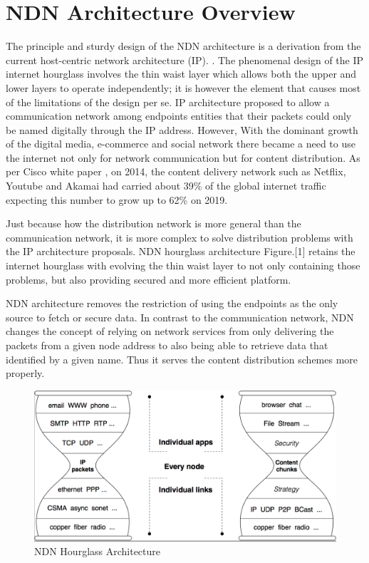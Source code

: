 \documentclass[twocolumn]{article}
\begin{document}
\section{NDN Architecture Overview}
The principle and sturdy design of the NDN architecture is a derivation from the current host-centric network architecture (IP). \cite{Pan2011}. The phenomenal design of the IP internet hourglass involves the thin waist layer which allows both the upper and lower layers to operate independently; it is however the element that causes most of the limitations of the design per se. IP architecture proposed to allow a communication network among endpoints entities that their packets could only be named digitally through the IP address. However, With the dominant growth of the digital media, e-commerce and social network there became a need to use the internet not only for network communication but for content distribution. As per Cisco white paper \cite{Cisco2015}, on 2014, the content delivery network such as Netflix, Youtube and Akamai had carried about 39\% of the global internet traffic expecting this number to grow up to 62\% on 2019.

Just because how the distribution network is more general than the communication network, it is more complex to solve distribution problems with the IP architecture proposals. NDN hourglass architecture Figure.[1] retains the internet hourglass with evolving the thin waist layer to not only containing those problems, but also providing secured and more efficient platform.

NDN architecture removes the restriction of using the endpoints as the only source to fetch or secure data. In contrast to the communication network, NDN changes the concept of relying on network services from only delivering the packets from a given node address to also being able to retrieve data that identified by a given name. Thus it serves the content distribution schemes more properly.
\begin{figure} [ht]
    \centering
    \includegraphics[width=\columnwidth]{hourglass.png}
    \caption{ \small NDN Hourglass Architecture}
    \label{fig:my_label}
\end{figure}
\end{document}
